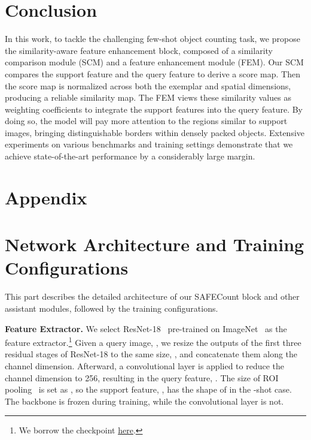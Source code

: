\documentclass[10pt,twocolumn,letterpaper]{article}
\newcommand{\method}{SAFECount\xspace}
\begin{document}
 \section{Conclusion}\label{sec:conclusion}


In this work, to tackle the challenging few-shot object counting task, we propose the similarity-aware feature enhancement block, composed of a similarity comparison module (SCM) and a feature enhancement module (FEM). Our SCM compares the support feature and the query feature to derive a score map. Then the score map is normalized across both the exemplar and spatial dimensions, producing a reliable similarity map. The FEM views these similarity values as weighting coefficients to integrate the support features into the query feature. By doing so, the model will pay more attention to the regions similar to support images, bringing distinguishable borders within densely packed objects. Extensive experiments on various benchmarks and training settings demonstrate that we achieve state-of-the-art performance by a considerably large margin. 


 
{
\small
\clearpage


}

\appendix
\section*{Appendix}
\section{Network Architecture and Training Configurations}\label{appendix:sec:architecture}


This part describes the detailed architecture of our \method block and other assistant modules, followed by the training configurations.


\vspace{2pt}\noindent\textbf{Feature Extractor.} 
We select ResNet-18~\cite{resnet} pre-trained on ImageNet~\cite{imagenet} as the feature extractor.\footnote{We borrow the checkpoint \href{https://download.pytorch.org/models/resnet18-5c106cde.pth}{here}.}
Given a query image, , we resize the outputs of the first three residual stages of ResNet-18 to the same size, , and concatenate them along the channel dimension. 
Afterward, a  convolutional layer is applied to reduce the channel dimension to 256, resulting in the query feature, . 
The size of ROI pooling~\cite{faster_rcnn} is set as , so the support feature, , has the shape of  in the -shot case. 
The backbone is frozen during training, while the  convolutional layer is not. 
\end{document}
